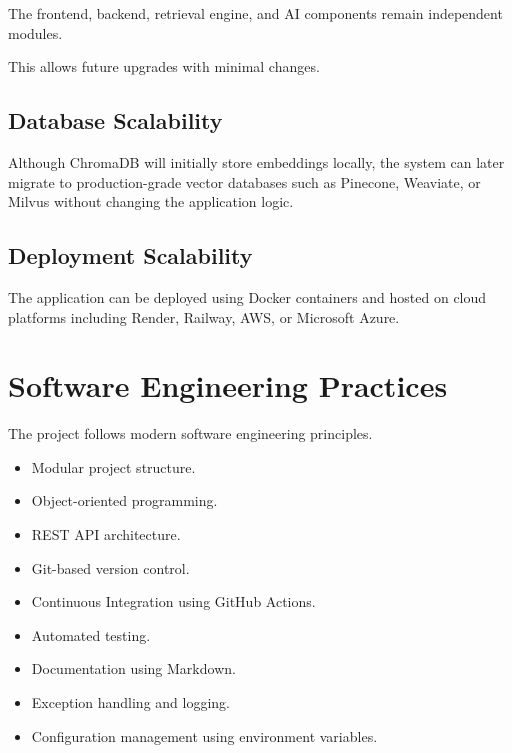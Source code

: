 \documentclass[11pt]{article}
\begin{document}
The frontend, backend, retrieval engine, and AI components remain independent modules.

This allows future upgrades with minimal changes.

\subsection{Database Scalability}

Although ChromaDB will initially store embeddings locally, the system can later migrate to production-grade vector databases such as Pinecone, Weaviate, or Milvus without changing the application logic.

\subsection{Deployment Scalability}

The application can be deployed using Docker containers and hosted on cloud platforms including Render, Railway, AWS, or Microsoft Azure.

\section{Software Engineering Practices}

The project follows modern software engineering principles.

\begin{itemize}

\item Modular project structure.

\item Object-oriented programming.

\item REST API architecture.

\item Git-based version control.

\item Continuous Integration using GitHub Actions.

\item Automated testing.

\item Documentation using Markdown.

\item Exception handling and logging.

\item Configuration management using environment variables.

\end{itemize}
\end{document}
